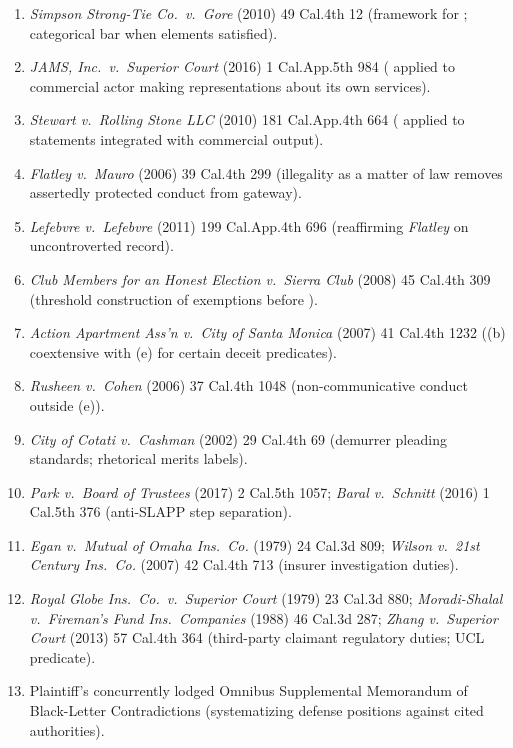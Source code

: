 \begin{enumerate}
\tightlist
\item \textit{Simpson Strong-Tie Co.\ v.\ Gore} (2010) 49 Cal.4th 12 (framework for ; categorical bar when elements satisfied).
\item \textit{JAMS, Inc.\ v.\ Superior Court} (2016) 1 Cal.App.5th 984 ( applied to commercial actor making representations about its own services).
\item \textit{Stewart v.\ Rolling Stone LLC} (2010) 181 Cal.App.4th 664 ( applied to statements integrated with commercial output).
\item \textit{Flatley v.\ Mauro} (2006) 39 Cal.4th 299 (illegality as a matter of law removes assertedly protected conduct from  gateway).
\item \textit{Lefebvre v.\ Lefebvre} (2011) 199 Cal.App.4th 696 (reaffirming \textit{Flatley} on uncontroverted record).
\item \textit{Club Members for an Honest Election v.\ Sierra Club} (2008) 45 Cal.4th 309 (threshold construction of  exemptions before ).
\item \textit{Action Apartment Ass'n v.\ City of Santa Monica} (2007) 41 Cal.4th 1232 ((b) coextensive with (e) for certain deceit predicates).
\item \textit{Rusheen v.\ Cohen} (2006) 37 Cal.4th 1048 (non-communicative conduct outside (e)).
\item \textit{City of Cotati v.\ Cashman} (2002) 29 Cal.4th 69 (demurrer pleading standards; rhetorical merits labels).
\item \textit{Park v.\ Board of Trustees} (2017) 2 Cal.5th 1057; \textit{Baral v.\ Schnitt} (2016) 1 Cal.5th 376 (anti-SLAPP step separation).
\item \textit{Egan v.\ Mutual of Omaha Ins.\ Co.} (1979) 24 Cal.3d 809; \textit{Wilson v.\ 21st Century Ins.\ Co.} (2007) 42 Cal.4th 713 (insurer investigation duties).
\item \textit{Royal Globe Ins.\ Co.\ v.\ Superior Court} (1979) 23 Cal.3d 880; \textit{Moradi-Shalal v.\ Fireman's Fund Ins.\ Companies} (1988) 46 Cal.3d 287; \textit{Zhang v.\ Superior Court} (2013) 57 Cal.4th 364 (third-party claimant regulatory duties; UCL predicate).
\item Plaintiff's concurrently lodged Omnibus Supplemental Memorandum of Black-Letter Contradictions (systematizing defense positions against cited authorities).
\end{enumerate}


